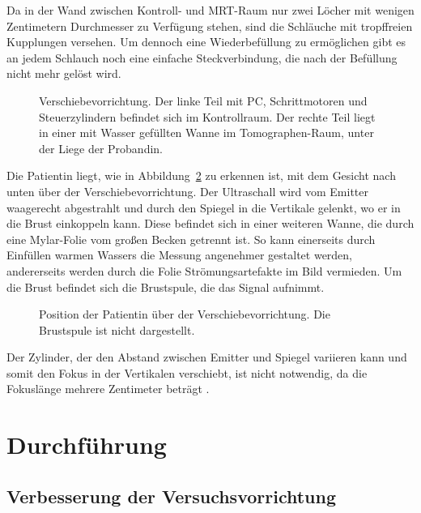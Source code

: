 \documentclass[
    11pt,
    ngerman
]{scrreprt}
\begin{document}
Da in der Wand zwischen Kontroll- und MRT-Raum nur zwei Löcher mit wenigen
Zentimetern Durchmesser zu Verfügung stehen, sind die Schläuche mit
tropffreien Kupplungen versehen. Um dennoch eine Wiederbefüllung zu ermöglichen
gibt es an jedem Schlauch noch eine einfache Steckverbindung, die nach der
Befüllung nicht mehr gelöst wird.

\begin{figure}[htbp]
    \centering
    \resizebox{\textwidth}{!}{}
    \caption{%
        Verschiebevorrichtung. Der linke Teil mit PC, Schrittmotoren und Steuerzylindern befindet sich im Kontrollraum. Der rechte Teil liegt in einer mit Wasser gefüllten Wanne im Tomographen-Raum, unter der Liege der Probandin.
    }
    \label{fig:aufbau_total}
\end{figure}

Die Patientin liegt, wie in Abbildung~\ref{fig:aufbau_emitter_spiegel} zu
erkennen ist, mit dem Gesicht nach unten über der Verschiebevorrichtung. Der
Ultraschall wird vom Emitter waagerecht abgestrahlt und durch den Spiegel in
die Vertikale gelenkt, wo er in die Brust einkoppeln kann. Diese befindet sich
in einer weiteren Wanne, die durch eine Mylar-Folie vom großen Becken getrennt
ist. So kann einerseits durch Einfüllen warmen Wassers die Messung angenehmer
gestaltet werden, andererseits werden durch die Folie Strömungsartefakte im
Bild vermieden. Um die Brust befindet sich die Brustspule, die das Signal
aufnimmt.

\begin{figure}[htbp]
    \centering
    \resizebox{.9\textwidth}{!}{}
    \caption{%
        Position der Patientin über der Verschiebevorrichtung. Die Brustspule ist nicht dargestellt.
    }
    \label{fig:aufbau_emitter_spiegel}
\end{figure}

Der Zylinder, der den Abstand zwischen Emitter und Spiegel variieren kann und
somit den Fokus in der Vertikalen verschiebt, ist nicht notwendig, da die
Fokuslänge mehrere Zentimeter beträgt \parencite{dipl_kofahl}.

\chapter{Durchführung}

\section{Verbesserung der Versuchsvorrichtung}
\end{document}
